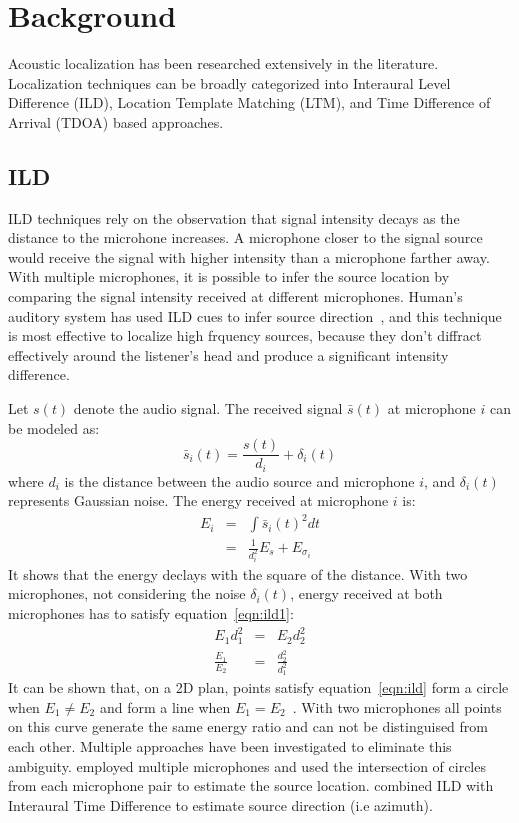 \chapter{Background}
Acoustic localization has been researched extensively in the literature. Localization techniques can be broadly categorized into Interaural Level Difference (ILD), Location Template Matching (LTM), and Time Difference of Arrival (TDOA) based approaches.

\section{ILD}
ILD techniques rely on the observation that signal intensity decays as the distance to the microhone increases. A microphone closer to the signal source would receive the signal with higher intensity than a microphone farther away. With multiple microphones, it is possible to infer the source location by comparing the signal intensity received at different microphones. Human's auditory system has used ILD cues to infer source direction~\cite{ild:2}, and this technique is most effective to localize high frquency sources, because they don't diffract effectively around the listener's head and produce a significant intensity difference.

Let $s(t)$ denote the audio signal. The received signal $\bar s(t) $ at microphone $i$ can be modeled as:
\[
\bar s_i(t) = \frac{s(t)}{d_i} + \delta_i(t)
\]
where $d_i$ is the distance between the audio source and microphone $i$, and $\delta_i(t)$ represents Gaussian noise.
The energy received at microphone $i$ is:
\begin{eqnarray}
E_i & = & \int \bar s_i(t)^2 dt \\
\label{eqn:ild1}
& = & \frac{1}{d_i^2} E_s + E_{\sigma_i}
\end{eqnarray}
It shows that the energy declays with the square of the distance. With two microphones, not considering the noise $\delta_i(t)$, energy received at both microphones has to satisfy equation~\ref{eqn:ild1}:
\begin{eqnarray}
E_1d_1^2 &=& E_2d_2^2\\
\label{eqn:ild}
\frac{E_1}{E_2} &=& \frac{d_2^2}{d_1^2}
\end{eqnarray}
It can be shown that, on a 2D plan, points satisfy equation~\ref{eqn:ild} form a circle when $E_1 \ne E_2$ and form a line when $E_1 = E_2$~\cite{ild:1}. With two microphones all points on this curve generate the same energy ratio and can not be distinguised from each other. Multiple approaches have been investigated to eliminate this ambiguity. \cite{ild:1} employed multiple microphones and used the intersection of circles from each microphone pair to estimate the source location. \cite{ild:2} combined ILD with Interaural Time Difference to estimate source direction (i.e azimuth).

